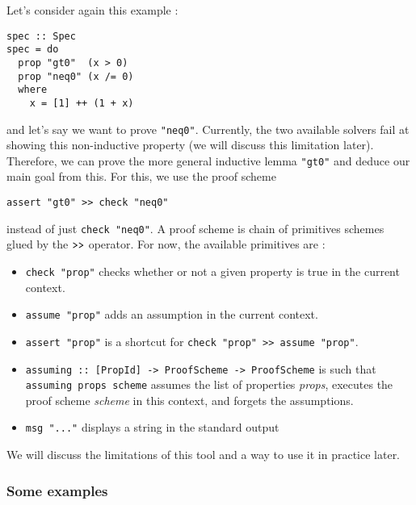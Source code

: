 Let's consider again this example :

\begin{lstlisting}[frame=single]
spec :: Spec
spec = do
  prop "gt0"  (x > 0)
  prop "neq0" (x /= 0)
  where
    x = [1] ++ (1 + x)

\end{lstlisting}
and let's say we want to prove \texttt{"neq0"}. Currently, the two
available solvers fail at showing this non-inductive property (we will
discuss this limitation later). Therefore, we can prove the more general
inductive lemma \texttt{"gt0"} and deduce our main goal from this. For
this, we use the proof scheme

\begin{lstlisting}[frame=single]
assert "gt0" >> check "neq0"
\end{lstlisting}


instead of just \texttt{check "neq0"}. A proof scheme is chain of
primitives schemes glued by the $\texttt{\textgreater{}\textgreater{}}$
operator. For now, the available primitives are :

\begin{itemize}
\itemsep1pt\parskip0pt
\item
  \texttt{check "prop"} checks whether or not a given property is true
  in the current context.
\item
  \texttt{assume "prop"} adds an assumption in the current context.
\item
  \texttt{assert "prop"} is a shortcut for
  \texttt{check "prop" \textgreater{}\textgreater{} assume "prop"}.
\item
  \texttt{assuming :: {[}PropId{]} -\textgreater{} ProofScheme -\textgreater{} ProofScheme}
  is such that \texttt{assuming props scheme} assumes the list of
  properties \emph{props}, executes the proof scheme \emph{scheme} in
  this context, and forgets the assumptions.
\item
  \texttt{msg "..."} displays a string in the standard output
\end{itemize}

We will discuss the limitations of this tool and a way to use it in
practice later.

\subsubsection{Some examples}\label{some-examples}


